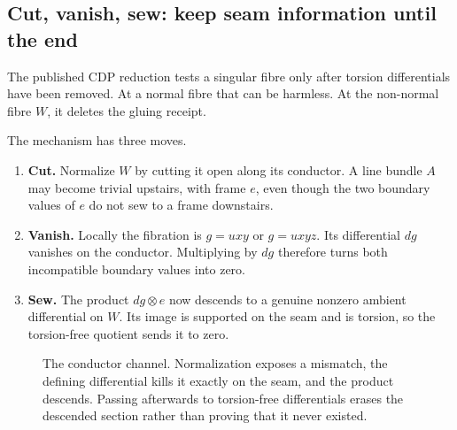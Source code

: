 \documentclass[11pt,reqno]{amsart}
\numberwithin{equation}{section}
\theoremstyle{definition}
\begin{document}
\subsection{Cut, vanish, sew: keep seam information until the end}\label{sec:cdp-human}

The published CDP reduction tests a singular fibre only after torsion differentials have been removed. At a normal fibre that can be harmless. At the non-normal fibre $W$, it deletes the gluing receipt.

The mechanism has three moves.
\begin{enumerate}
\item \textbf{Cut.} Normalize $W$ by cutting it open along its conductor. A line bundle $A$ may become trivial upstairs, with frame $e$, even though the two boundary values of $e$ do not sew to a frame downstairs.
\item \textbf{Vanish.} Locally the fibration is $g=uxy$ or $g=uxyz$. Its differential $dg$ vanishes on the conductor. Multiplying by $dg$ therefore turns both incompatible boundary values into zero.
\item \textbf{Sew.} The product $dg\otimes e$ now descends to a genuine nonzero ambient differential on $W$. Its image is supported on the seam and is torsion, so the torsion-free quotient sends it to zero.
\end{enumerate}

\begin{figure}[ht]
\centering
{}
\caption{The conductor channel. Normalization exposes a mismatch, the defining differential kills it exactly on the seam, and the product descends. Passing afterwards to torsion-free differentials erases the descended section rather than proving that it never existed.}
\label{fig:cut-vanish-sew}
\end{figure}
\end{document}
